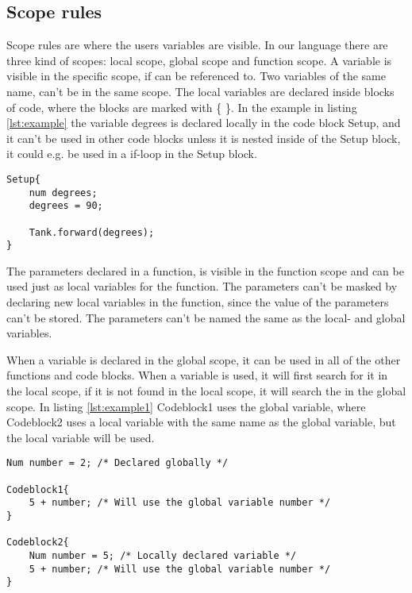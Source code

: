 \subsection{Scope rules}
Scope rules are where the users variables are visible. In our language there are three kind of scopes: local scope, global scope and function scope. A variable is visible in the specific scope, if can be referenced to. Two variables of the same name, can't be in the same scope. The local variables are declared inside blocks of code, where the blocks are marked with \{ \}. In the example in listing \ref{lst:example} the variable degrees is declared locally in the code block Setup, and it can't be used in other code blocks unless it is nested inside of the Setup block, it could e.g. be used in a if-loop in the Setup block. 

\begin{lstlisting}[caption={Example of local scoping rules},  xleftmargin=.2\textwidth, label={lst:example}]
Setup{
	num degrees;
	degrees = 90;
	
	Tank.forward(degrees);
}
\end{lstlisting}

The parameters declared in a function, is visible in the function scope and can be used just as local variables for the function. The parameters can't be masked by declaring new local variables in the function, since the value of the parameters can't be stored. The parameters can't be named the same as the local- and global variables. 

When a variable is declared in the global scope, it can be used in all of the other functions and code blocks. When a variable is used, it will first search for it in the local scope, if it is not found in the local scope, it will search the in the global scope. In listing \ref{lst:example1} Codeblock1 uses the global variable, where Codeblock2 uses a local variable with the same name as the global variable, but the local variable will be used.


\begin{lstlisting}[caption={Example of global scoping rules},  xleftmargin=.2\textwidth, label={lst:example1}]
Num number = 2; /* Declared globally */

Codeblock1{
	5 + number; /* Will use the global variable number */
}

Codeblock2{
	Num number = 5; /* Locally declared variable */
	5 + number; /* Will use the global variable number */
}
\end{lstlisting}
